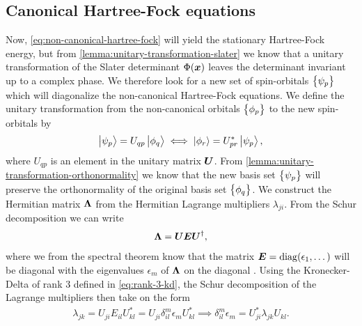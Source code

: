         \subsection{Canonical Hartree-Fock equations}
            Now, \autoref{eq:non-canonical-hartree-fock} will yield the
            stationary Hartree-Fock energy, but from
            \autoref{lemma:unitary-transformation-slater} we know that a unitary
            transformation of the Slater determinant $\Phi(\boldsymbol{x})$ leaves the
            determinant invariant up to a complex phase.
            We therefore look for a new set of spin-orbitals $\left\{ \psi_p \right\}$
            which will diagonalize the non-canonical Hartree-Fock equations.
            We define the unitary transformation from the non-canonical orbitals
            $\left\{ \phi_p \right\}$ to the new spin-orbitals by
            \begin{align}
                \ket{\psi_p} = U_{qp}\ket{\phi_q}
                \iff
                \ket{\phi_r} = U^{*}_{pr}\ket{\psi_p},
            \end{align}
            where $U_{qp}$ is an element in the unitary matrix $\boldsymbol{U}$.
            From \autoref{lemma:unitary-transformation-orthonormality} we know
            that the new basis set $\left\{ \psi_{p} \right\}$ will preserve the
            orthonormality of the original basis set $\left\{ \phi_q \right\}$.
            We construct the Hermitian matrix $\boldsymbol{\Lambda}$ from the Hermitian
            Lagrange multipliers $\lambda_{ji}$.
            From the Schur decomposition \cite{wiki:schur} we can write
            \begin{align}
                \boldsymbol{\Lambda} = \boldsymbol{U} \boldsymbol{E} \boldsymbol{U}^{\dagger},
            \end{align}
            where we from the spectral theorem know that the matrix
            $\boldsymbol{E} = \operatorname{diag}(\epsilon_1, \dots)$ will be diagonal with the
            eigenvalues $\epsilon_m$ of $\boldsymbol{\Lambda}$ on the diagonal
            \cite{wiki:spectral-theorem}.
            Using the Kronecker-Delta of rank 3 defined in
            \autoref{eq:rank-3-kd}, the Schur decomposition of the Lagrange
            multipliers then take on the form
            \begin{align}
                \lambda_{jk} = U_{ji} E_{il} U^{*}_{kl}
                = U_{ji} \delta^{m}_{il} \epsilon_m U^{*}_{kl}
                \implies
                \delta^{m}_{il} \epsilon_m
                = U^{*}_{ji} \lambda_{jk} U_{kl}.
            \end{align}
